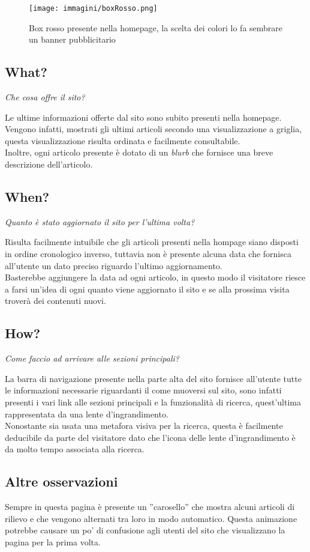 \begin{figure}[htpb]
\begin{center}
\texttt{[image: immagini/boxRosso.png]}
\caption{Box rosso presente nella homepage, la scelta dei colori lo fa sembrare un banner pubblicitario}
\label{boxRosso}
\end{center}
\end{figure}
\FloatBarrier

\subsection{What?}
\begin{center}
\textit{Che cosa offre il sito?}
\end{center}

Le ultime informazioni offerte dal sito sono subito presenti nella homepage. Vengono infatti, mostrati gli ultimi articoli secondo una visualizzazione a griglia, questa visualizzazione risulta ordinata e facilmente consultabile.\\
Inoltre, ogni articolo presente è dotato di un \textit{blurb} che fornisce una breve descrizione dell'articolo. 

\subsection{When?}
\begin{center}
\textit{Quanto è stato aggiornato il sito per l'ultima volta?}
\end{center}

Risulta facilmente intuibile che gli articoli presenti nella hompage siano disposti in ordine cronologico inverso, tuttavia non è presente alcuna data che fornisca all'utente un dato preciso riguardo l'ultimo aggiornamento.\\
Basterebbe aggiungere la data ad ogni articolo, in questo modo il visitatore riesce a farsi un'idea di ogni quanto viene aggiornato il sito e se alla prossima visita troverà dei contenuti nuovi.

\subsection{How?}
\begin{center}
\textit{Come faccio ad arrivare alle sezioni principali?}
\end{center}

La barra di navigazione presente nella parte alta del sito fornisce all'utente tutte le informazioni necessarie riguardanti il come muoversi sul sito, sono infatti presenti i vari link alle sezioni principali e la funzionalità di ricerca, quest'ultima rappresentata da una lente d'ingrandimento.\\
Nonostante sia usata una metafora visiva per la ricerca, questa è facilmente deducibile da parte del visitatore dato che l'icona delle lente d'ingrandimento è da molto tempo associata alla ricerca.

\subsection{Altre osservazioni}
Sempre in questa pagina è presente un ''carosello'' che mostra alcuni articoli di rilievo e che vengono alternati tra loro in modo automatico. Questa animazione potrebbe causare un po' di confusione agli utenti del sito che visualizzano la pagina per la prima volta.
